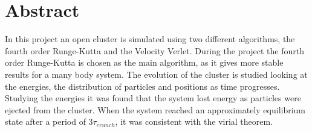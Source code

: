 \chapter*{Abstract}

In this project an open cluster is simulated using two different algorithms, the fourth order Runge-Kutta and the Velocity Verlet. During the project the fourth order Runge-Kutta is chosen as the main algorithm, as it gives more stable results for a many body system. The evolution of the cluster is studied looking at the energies, the distribution of particles and positions as time progresses. Studying the energies it was found that the system lost energy as particles were ejected from the cluster. When the system reached an approximately equilibrium state after a period of $3\tau_{crunch}$, it was consistent with the virial theorem.

